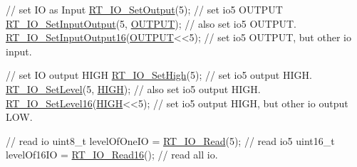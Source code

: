 \begin{DoxyCode}
\textcolor{comment}{// set IO as Input}
\mbox{\hyperlink{a00050_a80f50c7de76076789b624b7fce7531c6}{RT\_IO\_SetOutput}}(5);                 \textcolor{comment}{// set io5 OUTPUT}
\mbox{\hyperlink{a00050_ae845dc41cbf1b32b4d576373d1866d65}{RT\_IO\_SetInputOutput}}(5, \mbox{\hyperlink{a00050_a61a3c9a18380aafb6e430e79bf596557}{OUTPUT}});    \textcolor{comment}{// also set io5 OUTPUT.}
\mbox{\hyperlink{a00050_ade4bc867a36445fe0debc59cd5c9d9a5}{RT\_IO\_SetInputOutput16}}(\mbox{\hyperlink{a00050_a61a3c9a18380aafb6e430e79bf596557}{OUTPUT}}<<5);  \textcolor{comment}{// set io5 OUTPUT, but other io input.}

\textcolor{comment}{// set IO output HIGH}
\mbox{\hyperlink{a00050_a752d981d1948aeae63c1a86070ae8e3a}{RT\_IO\_SetHigh}}(5);           \textcolor{comment}{// set io5 output HIGH.}
\mbox{\hyperlink{a00050_a95fe40498ba314e1ea68aaa50335e7ef}{RT\_IO\_SetLevel}}(5, \mbox{\hyperlink{a00050_a5bb885982ff66a2e0a0a45a8ee9c35e2}{HIGH}});    \textcolor{comment}{// also set io5 output HIGH.}
\mbox{\hyperlink{a00050_a5a3ae496ca3e12098c74c9f13b20c554}{RT\_IO\_SetLevel16}}(\mbox{\hyperlink{a00050_a5bb885982ff66a2e0a0a45a8ee9c35e2}{HIGH}}<<5);  \textcolor{comment}{// set io5 output HIGH, but other io output LOW.}

\textcolor{comment}{// read io}
uint8\_t levelOfOneIO = \mbox{\hyperlink{a00050_aa69642c4177a35776090fdcf78d12e3b}{RT\_IO\_Read}}(5);   \textcolor{comment}{// read io5}
uint16\_t levelOf16IO = \mbox{\hyperlink{a00050_acf9c93d24ffeac5705da2c83ea2303d1}{RT\_IO\_Read16}}();  \textcolor{comment}{// read all io.}
\end{DoxyCode}
 